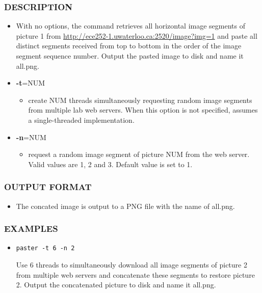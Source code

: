 \subsubsection*{DESCRIPTION}

\begin{itemize}
\item []
  With no options, the command retrieves all horizontal image segments of picture 1 from \url{http://ece252-1.uwaterloo.ca:2520/image?img=1} and paste all distinct segments received from top to bottom in the order of the image segment sequence number. Output the pasted image to disk and name it all.png.  
\item[] {\bf -t}=NUM
  \begin{itemize}
  \item[] create NUM threads simultaneously requesting random image segments from multiple lab web servers. When this option is not specified, assumes a single-threaded implementation.
  \end{itemize}
\item[] {\bf -n}=NUM
  \begin{itemize}
  \item[] request a random image segment of picture NUM from the web server. Valid values are 1, 2 and 3. Default value is set to 1.
  \end{itemize}
\end{itemize}
\subsubsection*{OUTPUT FORMAT}
\begin{itemize}
\item[] The concated image is output to a PNG file with the name of all.png. 
\end{itemize}

\subsubsection*{EXAMPLES}
\begin{itemize}
\item[]
\begin{verbatim}
paster -t 6 -n 2
\end{verbatim}
Use 6 threads to simultaneously download all image segments of picture 2 from multiple web servers and concatenate these segments to restore picture 2. Output the concatenated picture to disk and name it all.png. 
\end{itemize}

